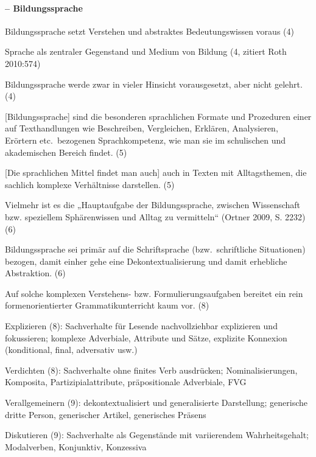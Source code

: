 






\paragraph*{\citet{Feilke2012} -- Bildungssprache}

Bildungssprache setzt Verstehen und abstraktes Bedeutungswissen voraus (4)

Sprache als zentraler Gegenstand und Medium von Bildung (4, zitiert Roth 2010:574)

Bildungssprache werde zwar in vieler Hinsicht vorausgesetzt, aber nicht gelehrt. (4)

[Bildungssprache] sind die besonderen sprachlichen Formate und Prozeduren einer auf Texthandlungen wie Beschreiben, Vergleichen, Erklären, Analysieren, Erörtern etc.\ bezogenen Sprachkompetenz, wie man sie im schulischen und akademischen Bereich findet. (5)

[Die sprachlichen Mittel findet man auch] auch in Texten mit Alltagsthemen, die sachlich komplexe Verhältnisse darstellen. (5)

Vielmehr ist es die „Hauptaufgabe der Bildungssprache, zwischen Wissenschaft bzw. speziellem Sphärenwissen und Alltag zu vermitteln“ (Ortner 2009, S. 2232) (6)

Bildungssprache sei primär auf die Schriftsprache (bzw.\ schriftliche Situationen) bezogen, damit einher gehe eine Dekontextualisierung und damit erhebliche Abstraktion. (6)

Auf solche komplexen Verstehens- bzw. Formulierungsaufgaben bereitet ein rein formenorientierter Grammatikunterricht kaum vor. (8)

Explizieren (8): Sachverhalte für Lesende nachvollziehbar explizieren und fokussieren; komplexe Adverbiale, Attribute und Sätze, explizite Konnexion (konditional, final, adversativ usw.)

Verdichten (8): Sachverhalte ohne finites Verb ausdrücken; Nominalisierungen, Komposita, Partizipialattribute, präpositionale Adverbiale, FVG

Verallgemeinern (9): dekontextualisiert und generalisierte Darstellung; generische dritte Person, generischer Artikel, generisches Präsens

Diskutieren (9): Sachverhalte als Gegenstände mit variierendem Wahrheitsgehalt; Modalverben, Konjunktiv, Konzessiva

